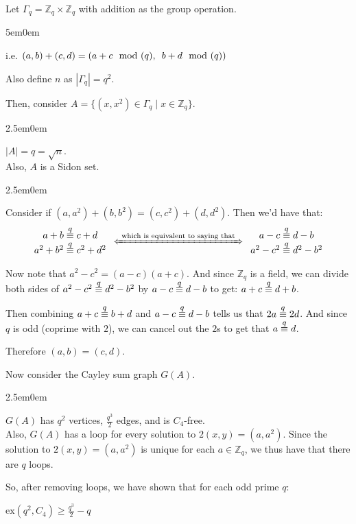 \documentclass{book}
\newcommand{\hTwo}{%
   \color{MidnightBlue}%
   \fontsize{13}{15}\selectfont%
}
\newcommand{\hThree}{%
   \color{PineGreen}
   \fontsize{13}{15}\selectfont%
}
\newcommand{\myComment}{%
   \color{RawerSienna}%
   \fontsize{12}{14}\selectfont%
}
\newenvironment{myIndent}{%
   \begin{adjustwidth}{2.5em}{0em}%
}{%
   \end{adjustwidth}%
}
\newenvironment{myDindent}{%
   \begin{adjustwidth}{5em}{0em}%
}{%
   \end{adjustwidth}%
}
\newcommand{\exNums}[1]{\mathrm{ex}(#1)}
\newcommand{\myHS}{ \hspace{0.5em}}
\newcommand{\myequiv}[1]{\stackrel{\mathclap{\mbox{\footnotesize{$#1$}}}}{\equiv}}
\newcommand{\retTwo}{\hfill\bigbreak}
\begin{document}
Let $\Gamma_q = \mathbb{Z}_q \times \mathbb{Z}_q$ with addition as the group operation.
{\begin{myDindent} \myComment
   i.e. $(a, b) + (c, d) = (a + c \mod{(q)}, \myHS b + d \mod{(q)})$ \retTwo
\end{myDindent}}

Also define $n$ as $|\Gamma_q| = q^2$.\retTwo

Then, consider $A = \{(x, x^2) \in \Gamma_q \mid x \in \mathbb{Z}_q\}$. 
{\begin{myIndent} \hTwo
   $|A| = q = \sqrt{n}$.\\
   Also, $A$ is a Sidon set.
   {\begin{myIndent} \hThree
      Consider if $(a, a^2) + (b, b^2) = (c, c^2) + (d, d^2)$. Then we'd have that:
      \[\begin{matrix}
         a + b \myequiv{q} c + d \\
         a^2 + b^2 \myequiv{q} c^2 + d^2
      \end{matrix} \myHS \xLeftrightarrow{\text{ which is equivalent to saying that }} \myHS \begin{matrix}
         a - c \myequiv{q} d - b \\
         a^2 - c^2 \myequiv{q} d^2 - b^2
      \end{matrix}\]

      Now note that $a^2 - c^2 = (a - c)(a + c)$. And since $\mathbb{Z}_q$ is a field, we can divide both sides of $a^2 - c^2 \myequiv{q} d^2 - b^2$ by $a - c \myequiv{q} d - b$ to get: $ a + c \myequiv{q} d + b$.
      \retTwo

      Then combining $a + c \myequiv{q} b + d$ and $a - c \myequiv{q} d - b$ tells us that $2a \myequiv{q} 2d$. And since $q$ is odd (coprime with $2$), we can cancel out the $2$s to get that $a \myequiv{q} d$. \retTwo

      Therefore $(a, b) = (c, d)$. \retTwo
   \end{myIndent}}
\end{myIndent}}

Now consider the Cayley sum graph $G(A)$.
{\begin{myIndent}\hTwo
   $G(A)$ has $q^2$ vertices, $\frac{q^3}{2}$ edges, and is $C_4$-free.\\
   Also, $G(A)$ has a loop for every solution to $2(x, y) = (a, a^2)$. Since the solution to $2(x, y) = (a, a^2)$ is unique for each $a \in \mathbb{Z}_q$, we thus have that there are $q$ loops. \retTwo

   So, after removing loops, we have shown that for each odd prime $q$:

   {\center $\exNums{q^2, C_4} \geq \frac{q^3}{2} - q$ \par}
\end{myIndent}}
\end{document}
